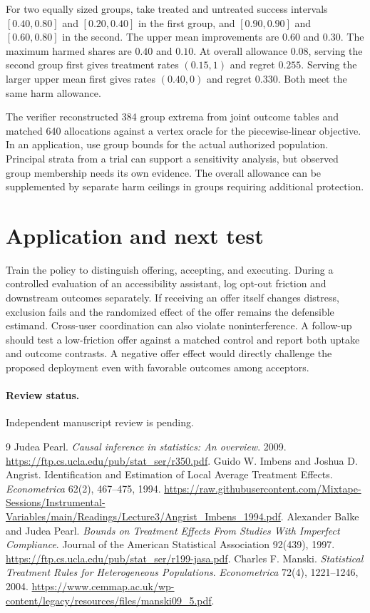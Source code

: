 \documentclass[11pt]{article}
\begin{document}
For two equally sized groups, take treated and untreated success
intervals $[0.40,0.80]$ and $[0.20,0.40]$ in the first group,
and $[0.90,0.90]$ and $[0.60,0.80]$ in the second. The upper mean
improvements are $0.60$ and $0.30$. The maximum harmed shares
are $0.40$ and $0.10$. At overall allowance $0.08$, serving the
second group first gives treatment rates $(0.15,1)$ and regret
$0.255$. Serving the larger upper mean first gives rates $(0.40,0)$
and regret $0.330$. Both meet the same harm allowance.

The verifier reconstructed 384 group extrema from joint outcome
tables and matched 640 allocations against a vertex oracle for the
piecewise-linear objective. In an application, use group bounds
for the actual authorized population. Principal strata from a trial
can support a sensitivity analysis, but observed group membership
needs its own evidence. The overall allowance can be supplemented
by separate harm ceilings in groups requiring additional protection.

\section{Application and next test}
Train the policy to distinguish offering, accepting, and executing. During a controlled evaluation of an accessibility assistant, log opt-out friction and downstream outcomes separately. If receiving an offer itself changes distress, exclusion fails and the randomized effect of the offer remains the defensible estimand. Cross-user coordination can also violate noninterference. A follow-up should test a low-friction offer against a matched control and report both uptake and outcome contrasts. A negative offer effect would directly challenge the proposed deployment even with favorable outcomes among acceptors.

\paragraph{Review status.} Independent manuscript review is pending.

\begin{thebibliography}{9}
 Judea Pearl. \emph{Causal inference in statistics: An overview}. 2009. \url{https://ftp.cs.ucla.edu/pub/stat_ser/r350.pdf}.
 Guido W. Imbens and Joshua D. Angrist.
Identification and Estimation of Local Average Treatment Effects.
\emph{Econometrica} 62(2), 467--475, 1994.
\url{https://raw.githubusercontent.com/Mixtape-Sessions/Instrumental-Variables/main/Readings/Lecture3/Angrist_Imbens_1994.pdf}.
 Alexander Balke and Judea Pearl.
\emph{Bounds on Treatment Effects From Studies With Imperfect Compliance}.
Journal of the American Statistical Association 92(439), 1997.
\url{https://ftp.cs.ucla.edu/pub/stat_ser/r199-jasa.pdf}.
 Charles F. Manski.
\emph{Statistical Treatment Rules for Heterogeneous Populations}.
\emph{Econometrica} 72(4), 1221--1246, 2004.
\url{https://www.cemmap.ac.uk/wp-content/legacy/resources/files/manski09_5.pdf}.
\end{thebibliography}
\end{document}
